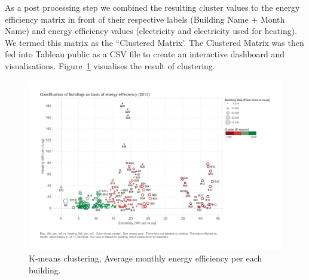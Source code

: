 As a post processing step we combined the resulting cluster values to the energy efficiency matrix in front of their respective labels (Building Name + Month Name) and energy efficiency values (electricity and electricity used for heating). We termed this matrix as the ``Clustered Matrix'. The Clustered Matrix was then fed into Tableau public as a CSV file to create an interactive dashboard and visualisations. Figure~\ref{fig:kmeans} visualises the result of clustering.  

\begin{figure}[!ht]
    \begin{center}
      \includegraphics[width=\textwidth]{images/kmeans.pdf}
      \caption{K-means clustering, Average monthly energy efficiency per each building.}
      \label{fig:kmeans}
    \end{center}
\end{figure} 

